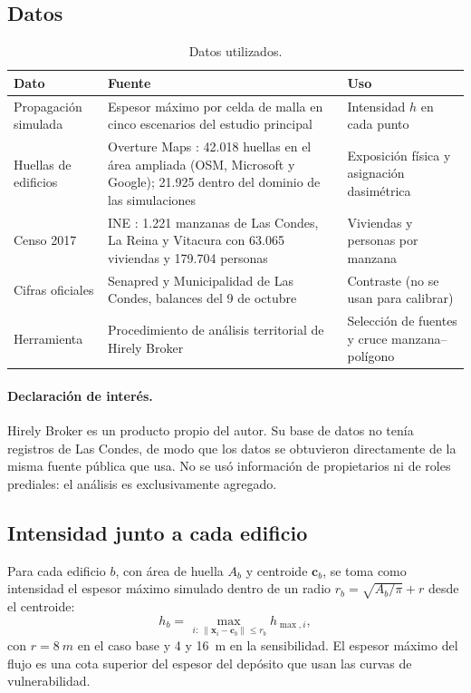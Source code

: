 \documentclass[10pt,a4paper]{article}
\begin{document}
\subsection{Datos}
\begin{table}[htbp]\centering\small
\caption{Datos utilizados.}\label{tab:datos}
\begin{tabular}{p{}p{}p{}}\toprule
Dato & Fuente & Uso\\\midrule
Propagación simulada & Espesor máximo por celda de malla en cinco escenarios del estudio principal \citep{wood2026} & Intensidad $h$ en cada punto\\
Huellas de edificios & Overture Maps \citep{overture2026}: 42.018 huellas en el área ampliada (OSM, Microsoft y Google); 21.925 dentro del dominio de las simulaciones & Exposición física y asignación dasimétrica\\
Censo 2017 & INE \citep{ine2017manzanas}: 1.221 manzanas de Las Condes, La Reina y Vitacura con 63.065 viviendas y 179.704 personas & Viviendas y personas por manzana\\
Cifras oficiales & Senapred y Municipalidad de Las Condes, balances del 9 de octubre \citep{senapred2026latribuna,cnn2026balance,elmostrador2026} & Contraste (no se usan para calibrar)\\
Herramienta & Procedimiento de análisis territorial de Hirely Broker \citep{hirelybroker2026} & Selección de fuentes y cruce manzana–polígono\\
\bottomrule\end{tabular}\end{table}

\paragraph{Declaración de interés.} Hirely Broker es un producto propio del autor. Su base de datos no tenía registros de Las Condes, de modo que los datos se obtuvieron directamente de la misma fuente pública que usa. No se usó información de propietarios ni de roles prediales: el análisis es exclusivamente agregado.

\subsection{Intensidad junto a cada edificio}
Para cada edificio $b$, con área de huella $A_b$ y centroide $\mathbf c_b$, se toma como intensidad el espesor máximo simulado dentro de un radio $r_b=\sqrt{A_b/\pi}+r$ desde el centroide:
\begin{equation}
h_b=\max_{\,i:\ \lVert\mathbf x_i-\mathbf c_b\rVert\le r_b} h_{\max,i},
\end{equation}
con $r=\SI{8}{m}$ en el caso base y 4 y \SI{16}{m} en la sensibilidad. El espesor máximo del flujo es una cota superior del espesor del depósito que usan las curvas de vulnerabilidad.
\end{document}
